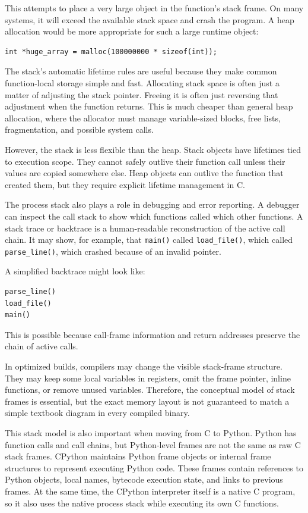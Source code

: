 This attempts to place a very large object in the function's stack frame. On many systems, it will exceed the available stack space and crash the program. A heap allocation would be more appropriate for such a large runtime object:

\begin{verbatim}
int *huge_array = malloc(100000000 * sizeof(int));
\end{verbatim}

The stack's automatic lifetime rules are useful because they make common function-local storage simple and fast. Allocating stack space is often just a matter of adjusting the stack pointer. Freeing it is often just reversing that adjustment when the function returns. This is much cheaper than general heap allocation, where the allocator must manage variable-sized blocks, free lists, fragmentation, and possible system calls.

However, the stack is less flexible than the heap. Stack objects have lifetimes tied to execution scope. They cannot safely outlive their function call unless their values are copied somewhere else. Heap objects can outlive the function that created them, but they require explicit lifetime management in C.

The process stack also plays a role in debugging and error reporting. A debugger can inspect the call stack to show which functions called which other functions. A stack trace or backtrace is a human-readable reconstruction of the active call chain. It may show, for example, that \texttt{main()} called \texttt{load\_file()}, which called \texttt{parse\_line()}, which crashed because of an invalid pointer.

A simplified backtrace might look like:

\begin{verbatim}
parse_line()
load_file()
main()
\end{verbatim}

This is possible because call-frame information and return addresses preserve the chain of active calls.

In optimized builds, compilers may change the visible stack-frame structure. They may keep some local variables in registers, omit the frame pointer, inline functions, or remove unused variables. Therefore, the conceptual model of stack frames is essential, but the exact memory layout is not guaranteed to match a simple textbook diagram in every compiled binary.

This stack model is also important when moving from C to Python. Python has function calls and call chains, but Python-level frames are not the same as raw C stack frames. CPython maintains Python frame objects or internal frame structures to represent executing Python code. These frames contain references to Python objects, local names, bytecode execution state, and links to previous frames. At the same time, the CPython interpreter itself is a native C program, so it also uses the native process stack while executing its own C functions.


